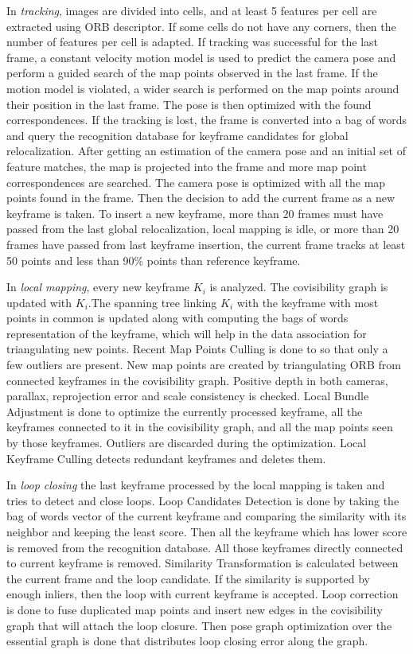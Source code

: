 In \textit{tracking}, images are divided into cells, and at least 5 features per cell are extracted using ORB descriptor. If some cells do not have any corners, then the number of features per cell is adapted. If tracking was successful for the 	last frame, a constant velocity motion model is used to predict the camera pose and perform a guided search of the map points observed in the last frame. If the motion model is violated, a wider search is performed on the map points around their position in the last frame. The pose is then optimized with the found correspondences. If the tracking is lost, the frame is converted into a bag of words and query the recognition database for keyframe candidates for global relocalization. After getting an estimation of the camera pose and an initial set of feature matches, the map is projected into the frame and more map point correspondences are searched. The camera pose is optimized with all the map points found in the frame. Then the decision to add the current frame as a new keyframe is taken. To insert a new keyframe, more than 20 frames must have passed from the last global relocalization, local mapping is idle, or more than 20 frames have passed from last keyframe insertion, the current frame tracks at least 50 points and less than 90\% points than reference keyframe.

In \textit{local mapping}, every new keyframe $K_i$ is analyzed. The covisibility graph is updated with $K_i$.The spanning tree linking $K_i$ with the keyframe with most points in common is updated along with computing the bags of words representation of the keyframe, which will help in the data association for triangulating new points. Recent Map Points Culling is done to so that only a few outliers are present. New map points are created by triangulating ORB from connected keyframes in the covisibility graph. Positive depth in both cameras, parallax, reprojection error and scale consistency is checked. Local Bundle Adjustment is done to optimize the currently processed keyframe, all the keyframes connected to it in the covisibility graph, and all the map points seen by those keyframes. Outliers are discarded during the optimization. Local Keyframe Culling detects redundant keyframes and deletes them.

In \textit{loop closing}  the last keyframe processed by the local mapping is taken and tries to detect and close loops. Loop Candidates Detection is done by taking the bag of words vector of the current keyframe and comparing the similarity with its neighbor and keeping the least score. Then all the keyframe which has lower score is removed from the recognition database. All those keyframes directly connected to current keyframe is removed. Similarity Transformation is calculated between the current frame and the loop candidate. If the similarity is supported by enough inliers, then the loop with current keyframe is accepted. Loop correction is done to fuse duplicated map points and insert new edges in the covisibility graph that will attach the loop closure. Then pose graph optimization over the essential graph is done that distributes loop closing error along the graph. 


